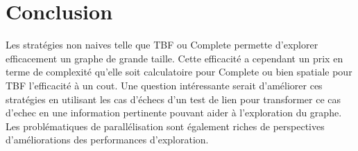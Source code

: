 \section{Conclusion}

Les stratégies non naives telle que TBF ou Complete permette d'explorer efficacement
un graphe de grande taille. Cette efficacité a cependant un prix en terme de complexité
qu'elle soit calculatoire pour Complete ou bien spatiale pour TBF l'efficacité à un cout.
Une question intéressante serait d'améliorer ces stratégies en utilisant les cas d'échecs
d'un test de lien pour transformer ce cas d'echec en une information pertinente pouvant aider
à l'exploration du graphe. Les problématiques de parallélisation sont également riches de
perspectives d'améliorations des performances d'exploration.
